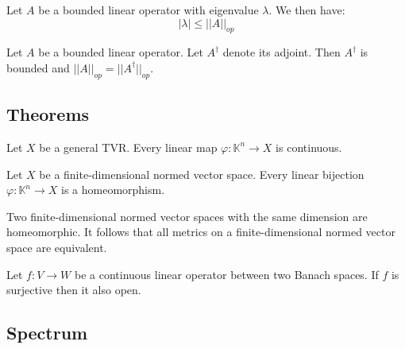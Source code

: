 	\begin{property}
		Let $A$ be a bounded linear operator with eigenvalue $\lambda$. We then have:
		\begin{equation}
			|\lambda|\leq||A||_{op}
		\end{equation}
	\end{property}
	\begin{property}
		Let $A$ be a bounded linear operator. Let $A^\dag$ denote its adjoint\footnotemark. Then $A^\dag$ is bounded and $||A||_{op} = ||A^\dag||_{op}$.
	\end{property}

\subsection{Theorems}

	\begin{property}
		Let $X$ be a general TVR. Every linear map $\varphi:\mathbb{K}^n\rightarrow X$ is continuous.
	\end{property}
	\begin{property}
		Let $X$ be a finite-dimensional normed vector space. Every linear bijection $\varphi:\mathbb{K}^n\rightarrow X$ is a homeomorphism.
	\end{property}
	\begin{result}
		Two finite-dimensional normed vector spaces with the same dimension are homeomorphic. It follows that all metrics on a finite-dimensional normed vector space are equivalent.
	\end{result}

	\begin{theorem}
		Let $f:V\rightarrow W$ be a continuous linear operator between two Banach spaces. If $f$ is surjective then it also open.
	\end{theorem}

\subsection{Spectrum}

	
